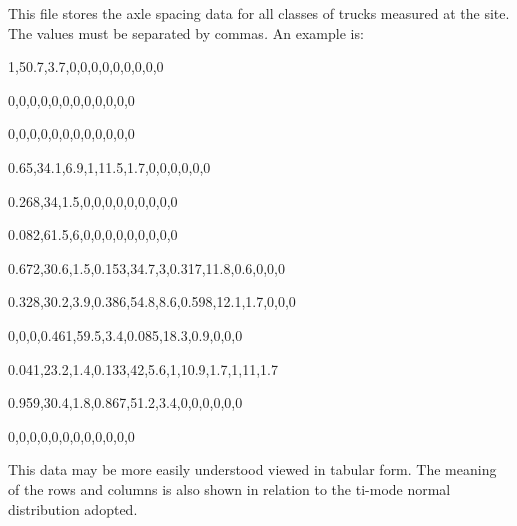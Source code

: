 \documentclass[
]{article}
\begin{document}
This file stores the axle spacing data for all classes of trucks
measured at the site. The values must be separated by commas\emph{.} An
example is:

1,50.7,3.7,0,0,0,0,0,0,0,0,0

0,0,0,0,0,0,0,0,0,0,0,0

0,0,0,0,0,0,0,0,0,0,0,0

0.65,34.1,6.9,1,11.5,1.7,0,0,0,0,0,0

0.268,34,1.5,0,0,0,0,0,0,0,0,0

0.082,61.5,6,0,0,0,0,0,0,0,0,0

0.672,30.6,1.5,0.153,34.7,3,0.317,11.8,0.6,0,0,0

0.328,30.2,3.9,0.386,54.8,8.6,0.598,12.1,1.7,0,0,0

0,0,0,0.461,59.5,3.4,0.085,18.3,0.9,0,0,0

0.041,23.2,1.4,0.133,42,5.6,1,10.9,1.7,1,11,1.7

0.959,30.4,1.8,0.867,51.2,3.4,0,0,0,0,0,0

0,0,0,0,0,0,0,0,0,0,0,0

This data may be more easily understood viewed in tabular form. The
meaning of the rows and columns is also shown in relation to the ti-mode
normal distribution adopted.
\end{document}
